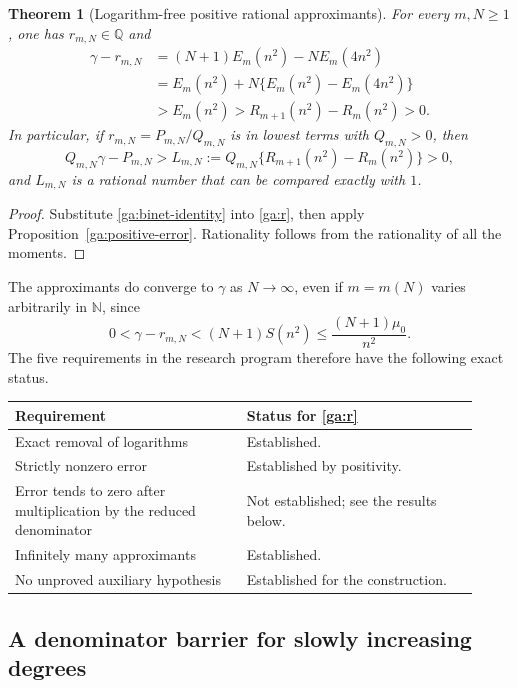 \documentclass[11pt,a4paper]{article}
\numberwithin{equation}{section}
\newtheorem{theorem}{Theorem}[section]
\theoremstyle{definition}
\theoremstyle{remark}
\newcommand{\Q}{\mathbb Q}
\newcommand{\N}{\mathbb N}
\begin{document}
\begin{theorem}[Logarithm-free positive rational approximants]
\label{ga:logfree}
For every $m,N\ge1$, one has $r_{m,N}\in\Q$ and
\begin{equation}\label{ga:gamma-error}
\begin{split}
 \gamma-r_{m,N}
 &=(N+1)E_m(n^2)-NE_m(4n^2)\\
 &=E_m(n^2)+N\{E_m(n^2)-E_m(4n^2)\}\\
 &>E_m(n^2)>R_{m+1}(n^2)-R_m(n^2)>0.
\end{split}
\end{equation}
In particular, if $r_{m,N}=P_{m,N}/Q_{m,N}$ is in lowest terms
with $Q_{m,N}>0$, then
\begin{equation}\label{ga:exact-lower}
 Q_{m,N}\gamma-P_{m,N}
 >
 L_{m,N}:=
 Q_{m,N}\{R_{m+1}(n^2)-R_m(n^2)\}>0,
\end{equation}
and $L_{m,N}$ is a rational number that can be compared exactly
with $1$.
\end{theorem}
\begin{proof}
Substitute \eqref{ga:binet-identity} into \eqref{ga:r}, then apply
Proposition~\ref{ga:positive-error}.  Rationality follows from the
rationality of all the moments.
\end{proof}

The approximants do converge to $\gamma$ as $N\to\infty$, even if
$m=m(N)$ varies arbitrarily in $\N$, since
\[
 0<\gamma-r_{m,N}
 <(N+1)S(n^2)\le\frac{(N+1)\mu_0}{n^2}.
\]
The five requirements in the research program therefore have the
following exact status.

\begin{center}
\begin{tabular}{@{}p{0.46\linewidth}p{0.46\linewidth}@{}}
\hline
Requirement & Status for \eqref{ga:r}\\
\hline
Exact removal of logarithms & Established.\\
Strictly nonzero error & Established by positivity.\\
Error tends to zero after multiplication by the reduced denominator
 & Not established; see the results below.\\
Infinitely many approximants & Established.\\
No unproved auxiliary hypothesis & Established for the construction.\\
\hline
\end{tabular}
\end{center}

\subsection{A denominator barrier for slowly increasing degrees}
\label{ga:slow-degree}
\end{document}
